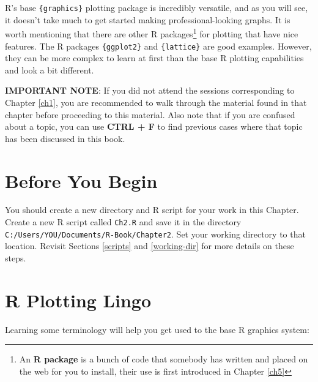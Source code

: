 \documentclass[]{book}
\let\rmarkdownfootnote\footnote%
\def\footnote{\protect\rmarkdownfootnote}
\theoremstyle{definition}
\theoremstyle{definition}
\theoremstyle{definition}
\theoremstyle{remark}
\begin{document}
R's base \texttt{\{graphics\}} plotting package is incredibly versatile,
and as you will see, it doesn't take much to get started making
professional-looking graphs. It is worth mentioning that there are other
R packages\footnote{An \textbf{R package} is a bunch of code that
  somebody has written and placed on the web for you to install, their
  use is first introduced in Chapter \ref{ch5}} for plotting that have
nice features. The R packages \texttt{\{ggplot2\}} \citep{R-ggplot2} and
\texttt{\{lattice\}} \citep{R-lattice} are good examples. However, they
can be more complex to learn at first than the base R plotting
capabilities and look a bit different.

\textbf{IMPORTANT NOTE}: If you did not attend the sessions
corresponding to Chapter \ref{ch1}, you are recommended to walk through
the material found in that chapter before proceeding to this material.
Also note that if you are confused about a topic, you can use
\textbf{CTRL + F} to find previous cases where that topic has been
discussed in this book.

\section*{Before You Begin}\label{before-you-begin}

You should create a new directory and R script for your work in this
Chapter. Create a new R script called \texttt{Ch2.R} and save it in the
directory \texttt{C:/Users/YOU/Documents/R-Book/Chapter2}. Set your
working directory to that location. Revisit Sections \ref{scripts} and
\ref{working-dir} for more details on these steps.

\section{R Plotting Lingo}\label{r-plotting-lingo}

Learning some terminology will help you get used to the base R graphics
system:
\end{document}
